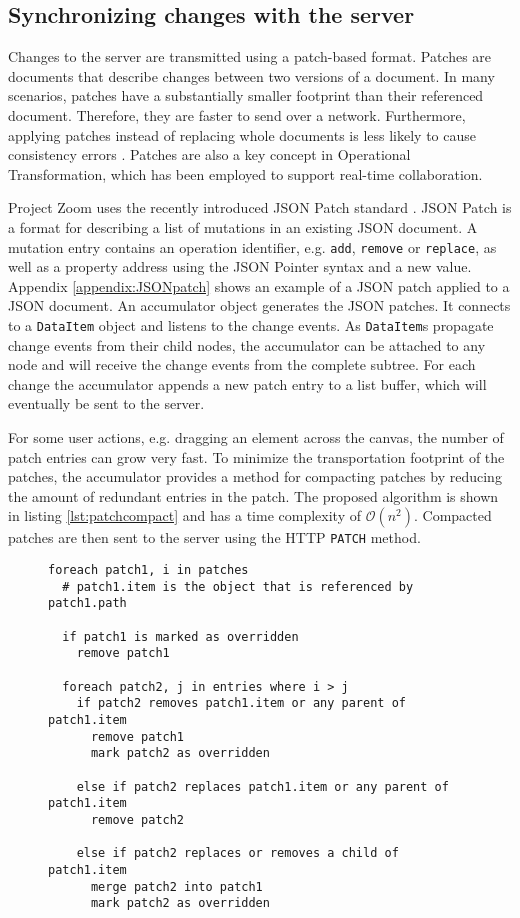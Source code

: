 \subsection{Synchronizing changes with the server}

Changes to the server are transmitted using a patch-based format. Patches are documents that describe changes between two versions of a document. In many scenarios, patches have a substantially smaller footprint than their referenced document. Therefore, they are faster to send over a network. Furthermore, applying patches instead of replacing whole documents is less likely to cause consistency errors \cite{Ellis_1989}. Patches are also a key concept in Operational Transformation, which has been employed to support real-time collaboration.

Project Zoom uses the recently introduced JSON Patch standard \cite{RFC6902}. JSON Patch is a format for describing a list of mutations in an existing JSON document. A mutation entry contains an operation identifier, e.g. \texttt{add}, \texttt{remove} or \texttt{replace}, as well as a property address using the JSON Pointer syntax and a new value. Appendix \ref{appendix:JSONpatch} shows an example of a JSON patch applied to a JSON document. 
An accumulator object generates the JSON patches. It connects to a \texttt{DataItem} object and listens to the change events. As \texttt{DataItem}s propagate change events from their child nodes, the accumulator can be attached to any node and will receive the change events from the complete subtree. For each change the accumulator appends a new patch entry to a list buffer, which will eventually be sent to the server.

For some user actions, e.g. dragging an element across the canvas, the number of patch entries can grow very fast. To minimize the transportation footprint of the patches, the accumulator provides a method for compacting patches by reducing the amount of redundant entries in the patch. The proposed algorithm is shown in listing \ref{lst:patchcompact} and has a time complexity of $\mathcal O(n^2)$. Compacted patches are then sent to the server using the HTTP \texttt{PATCH} method.

\begin{figure}
\begin{lstlisting}[language=pseudo,caption={Pseudo code for compacting a chronologically ordered list of JSON patches},label={lst:patchcompact}]
foreach patch1, i in patches
  # patch1.item is the object that is referenced by patch1.path
  
  if patch1 is marked as overridden
    remove patch1
  
  foreach patch2, j in entries where i > j
    if patch2 removes patch1.item or any parent of patch1.item
      remove patch1
      mark patch2 as overridden
      
    else if patch2 replaces patch1.item or any parent of patch1.item
      remove patch2
     
    else if patch2 replaces or removes a child of patch1.item
      merge patch2 into patch1
      mark patch2 as overridden
\end{lstlisting}
\end{figure}


